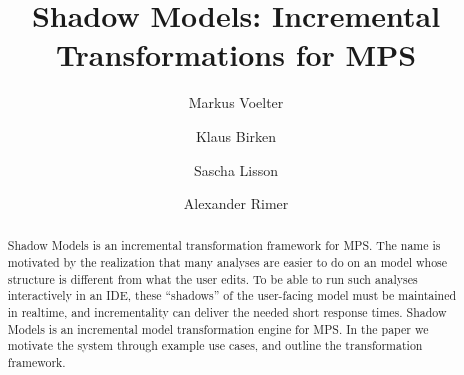 \documentclass[sigplan,screen]{acmart}
\begin{document}
%
\title{Shadow Models: Incremental Transformations for MPS}

%
\author{Markus Voelter}

\author{Klaus Birken}

\author{Sascha Lisson}


\author{Alexander Rimer}









%
\renewcommand{\shortauthors}{Voelter et al.}

\begin{abstract}
Shadow Models is an incremental transformation framework for MPS. The name is motivated
by the realization that many analyses are easier to do on an model whose structure is different from
what the user edits. To be able to run such analyses interactively in an IDE, these ``shadows''
of the user-facing model must be maintained in realtime, and incrementality can deliver the needed
short response times. Shadow Models is an incremental model transformation engine for MPS. 
In the paper we motivate the system through example use cases, 
and outline the transformation framework.
\end{abstract}
\end{document}
